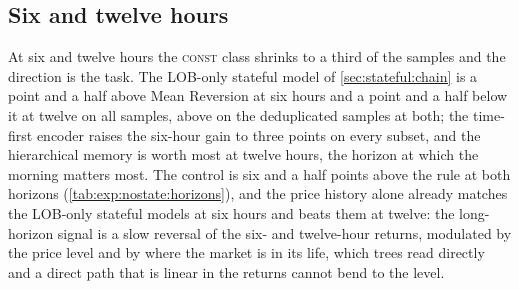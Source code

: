 \subsection{Six and twelve hours}
\label{sec:horizons:long}

At six and twelve hours the \textsc{const} class shrinks to a third of the samples and the
direction is the task.  The LOB-only stateful model of \cref{sec:stateful:chain} is a point
and a half above Mean Reversion at six hours and a point and a half below it at twelve on
all samples, above on the deduplicated samples at both; the time-first encoder raises the
six-hour gain to three points on every subset, and the hierarchical memory is worth most at
twelve hours, the horizon at which the morning matters most.  The control is six and a half
points above the rule at both horizons (\cref{tab:exp:nostate:horizons}), and the price
history alone already matches the LOB-only stateful models at six hours and beats them at
twelve: the long-horizon signal is a slow
reversal of the six- and twelve-hour returns, modulated by the price level and by where the
market is in its life, which trees read directly and a direct path that is linear in the
returns cannot bend to the level.

